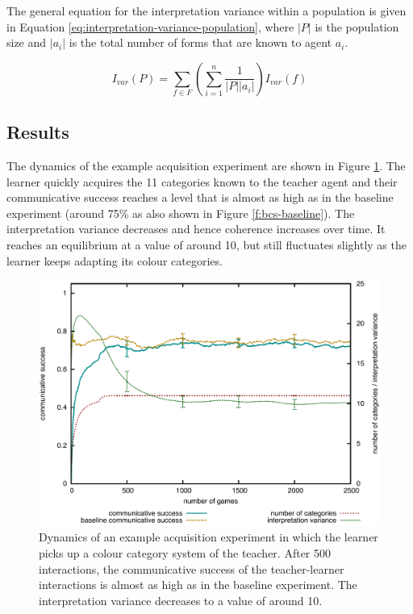 The general equation for the interpretation variance within a
population is given in Equation
\ref{eq:interpretation-variance-population}, where $|P|$ is the
population size and $|a_i|$ is the total number of forms that are
known to agent $a_i$.

\begin{equation}
I_{var} (P) = \sum_{f \in F} \left(\sum_{i=1}^{n} \frac{1}{|P||a_i|}\right) I_{var} (f)
\label{eq:interpretation-variance-population}
\end{equation}

\subsection{Results}

The dynamics of the example acquisition experiment are shown in Figure
\ref{f:basic-strategy-agent-categories}. The learner quickly acquires
the 11 categories known to the teacher agent and their communicative
success reaches a level that is almost as high as in the baseline
experiment (around 75\% as also shown in Figure
\ref{f:bcs-baseline}). The interpretation variance
decreases and hence coherence increases over time. It reaches an
equilibrium at a value of around 10, but still fluctuates slightly as
the learner keeps adapting its colour categories.

\begin{figure}[htbp]
  \begin{center}
    \includegraphics[width=\textwidth]{./basic-operators/figures/acquisition.pdf}
    \caption[Dynamics of an example acquisition experiment]{Dynamics
      of an example acquisition experiment in which the learner picks
      up a colour category system of the teacher. After 500
      interactions, the communicative success of the teacher-learner
      interactions is almost as high as in the baseline
      experiment. The interpretation variance decreases to a value of
      around 10.}
    \label{f:basic-strategy-agent-categories}
  \end{center}
\end{figure}

